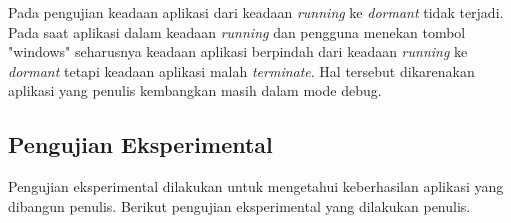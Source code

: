 \hspace{0.5cm} Pada pengujian keadaan aplikasi dari keadaan \textit{running} ke \textit{dormant} tidak terjadi. Pada saat aplikasi dalam keadaan \textit{running} dan pengguna menekan tombol "windows" seharusnya keadaan aplikasi berpindah dari keadaan \textit{running} ke \textit{dormant} tetapi keadaan aplikasi malah \textit{terminate}. Hal tersebut dikarenakan aplikasi yang penulis kembangkan masih dalam mode debug.

\subsection{Pengujian Eksperimental}
\label{lab:Pengujian Eksperimental}
\hspace{0.5cm} Pengujian eksperimental dilakukan untuk mengetahui keberhasilan aplikasi yang dibangun penulis. Berikut pengujian eksperimental yang dilakukan penulis.

